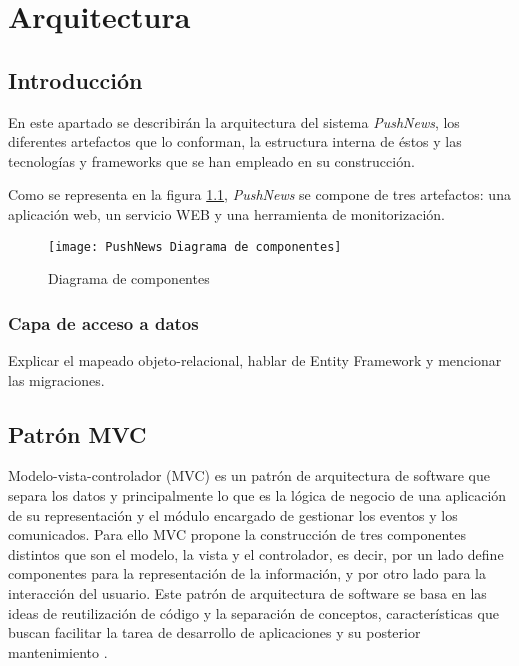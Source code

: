 \chapter{Arquitectura}

\section{Introducción}
En este apartado se describirán la arquitectura del sistema \emph{PushNews}, los diferentes artefactos que lo conforman, la estructura interna de éstos y las tecnologías y frameworks que se han empleado en su construcción.

Como se representa en la figura \ref{fig:diagrama-componentes}, \emph{PushNews} se compone de tres artefactos: una aplicación web, un servicio WEB y una herramienta de monitorización.

\begin{figure}[hb]
  \centering
  \texttt{[image: PushNews Diagrama de componentes]}
  \caption{Diagrama de componentes}
  \label{fig:diagrama-componentes}
\end{figure}

\subsection{Capa de acceso a datos}
Explicar el mapeado objeto-relacional, hablar de Entity Framework y mencionar las migraciones.

\section{Patrón MVC}

Modelo-vista-controlador (MVC) es un patrón de arquitectura de software que separa los datos y principalmente lo que es la lógica de negocio de una aplicación de su representación y el módulo encargado de gestionar los eventos y los comunicados. Para ello MVC propone la construcción de tres componentes distintos que son el modelo, la vista y el controlador, es decir, por un lado define componentes para la representación de la información, y por otro lado para la interacción del usuario. Este patrón de arquitectura de software se basa en las ideas de reutilización de código y la separación de conceptos, características que buscan facilitar la tarea de desarrollo de aplicaciones y su posterior mantenimiento \cite{wiki-mvc}.


